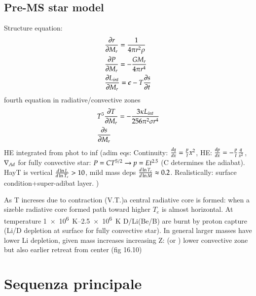 \documentclass[main.tex]{subfiles}
\begin{document}
\subsection{Pre-MS star model}
Structure equation:
\begin{align*}
&\PDy{M_r}{r}=\frac{1}{4\pi r^2\rho}\\
&\PDy{M_r}{P}=-\frac{GM_r}{4\pi r^4}\\
&\PDy{M_r}{L_{int}}=\epsilon-T\PDy{t}{s}
\end{align*}
fourth equation in radiative/convective zones
\begin{align*}
&T^3\PDy{M_r}{T}=-\frac{3\kappa L_{int}}{256\pi^2\sigma r^4}\\
&\PDy{M_r}{s}
\end{align*}
HE integrated from phot to inf
(adim eqs:
Continuity: $\TDy{x}{q}=\frac{p}{t}x^2$, HE: $\TDy{x}{p}=-\frac{p}{t}\frac{q}{x^2}$, $\nad$ for fully convective star: $P=CT\expy{5/2}\to p=Et\expy{2.5}$ (C determines the adiabat).
HayT is vertical $\TDly{T_e}{L}>10$, mild mass deps $\TDly{M}{T_e}\approx0.2$. Realistically: surface condition+super-adibat layer.
)

As T increses due to contraction (V.T.)a central radiative core is formed: when a sizeble radiative core formed path toward higher $T_e$ is almost horizontal.
At temperature \SIrange{1e6}{2.5e6}{\kelvin} D/Li(Be/B) are burnt by proton capture (Li/D depletion at surface for fully convective star).
In general larger masses have lower Li depletion, given mass increases increasing Z: (or ) lower convective zone but also earlier retreat from center (fig 16.10)


\section{Sequenza principale}
\end{document}
